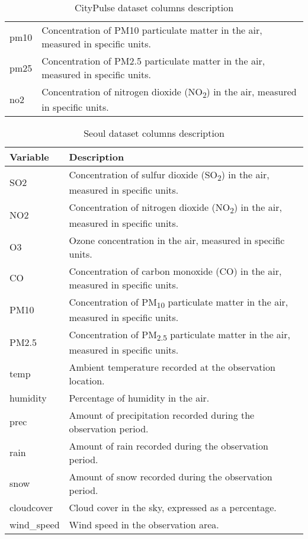 \begin{table}[ht]
\begin{tabular}{|p{3cm}|p{9cm}|}
        pm10 & Concentration of PM10 particulate matter in the air, measured in specific units. \\ 
        pm25 & Concentration of PM2.5 particulate matter in the air, measured in specific units. \\ 
        no2 & Concentration of nitrogen dioxide (NO\textsubscript{2}) in the air, measured in specific units. \\ 
        \hline
    \end{tabular}
    \caption{CityPulse dataset columns description}
     \label{apptable:Citypulse_variable_descriptio}
\end{table}

\begin{table}[ht]
    
    \centering
    \begin{tabular}{|p{3cm}|p{9cm}|}
        \hline
        \textbf{Variable} & \textbf{Description} \\
        \hline
        SO2 & Concentration of sulfur dioxide (SO\textsubscript{2}) in the air, measured in specific units. \\
        NO2 & Concentration of nitrogen dioxide (NO\textsubscript{2}) in the air, measured in specific units. \\
        O3 & Ozone concentration in the air, measured in specific units. \\
        CO & Concentration of carbon monoxide (CO) in the air, measured in specific units. \\
        PM10 & Concentration of PM\textsubscript{10} particulate matter in the air, measured in specific units. \\
        PM2.5 & Concentration of PM\textsubscript{2.5} particulate matter in the air, measured in specific units. \\
        temp & Ambient temperature recorded at the observation location. \\
        humidity & Percentage of humidity in the air. \\
        prec & Amount of precipitation recorded during the observation period. \\
        rain & Amount of rain recorded during the observation period. \\
        snow & Amount of snow recorded during the observation period. \\
        cloudcover & Cloud cover in the sky, expressed as a percentage. \\
        wind\_speed & Wind speed in the observation area. \\
        \hline
    \end{tabular}
    \caption{Seoul dataset columns description}
    \label{apptable:Seoul_variable_description}
\end{table}



